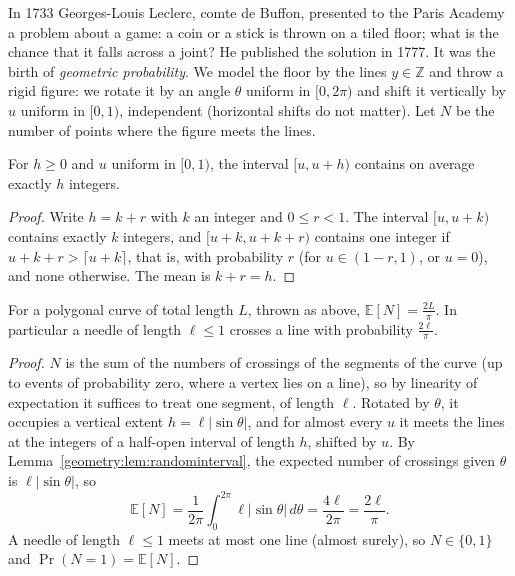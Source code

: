 In 1733 Georges-Louis Leclerc, comte de Buffon, presented to the Paris Academy a problem about a game: a coin or a stick is thrown on a tiled floor; what is the
chance that it falls across a joint? He published the solution in 1777. It was the birth of \emph{geometric probability}. We model the floor by the lines
$y\in\mathbb Z$ and throw a rigid figure: we rotate it by an angle $\theta$ uniform in $[0,2\pi)$ and shift it vertically by $u$ uniform in $[0,1)$, independent
(horizontal shifts do not matter). Let $N$ be the number of points where the figure meets the lines.

\begin{lemma}\label{geometry:lem:randominterval}
For $h\ge0$ and $u$ uniform in $[0,1)$, the interval $[u,u+h)$ contains on average exactly $h$ integers.
\end{lemma}

\begin{proof}
Write $h=k+r$ with $k$ an integer and $0\le r<1$. The interval $[u,u+k)$ contains exactly $k$ integers, and $[u+k,u+k+r)$ contains one integer if
$u+k+r>\lceil u+k\rceil$, that is, with probability $r$ (for $u\in(1-r,1)$, or $u=0$), and none otherwise. The mean is $k+r=h$.
\end{proof}

\begin{theorem}\label{geometry:thm:buffon}
For a polygonal curve of total length $L$, thrown as above, $\mathbb E[N]=\frac{2L}\pi$. In particular a needle of length $\ell\le1$ crosses a line with
probability $\frac{2\ell}\pi$.
\end{theorem}

\begin{proof}
$N$ is the sum of the numbers of crossings of the segments of the curve (up to events of probability zero, where a vertex lies on a line), so by
linearity of expectation it suffices to treat one segment, of length $\ell$. Rotated by $\theta$, it occupies a vertical extent $h=\ell|\sin\theta|$, and for
almost every $u$ it meets the lines at the integers of a half-open interval of length $h$, shifted by $u$. By Lemma~\ref{geometry:lem:randominterval}, the expected
number of crossings given $\theta$ is $\ell|\sin\theta|$, so
\[
\mathbb E[N]=\frac1{2\pi}\int_0^{2\pi}\ell|\sin\theta|\,d\theta=\frac{4\ell}{2\pi}=\frac{2\ell}\pi.
\]
A needle of length $\ell\le1$ meets at most one line (almost surely), so $N\in\{0,1\}$ and $\Pr(N=1)=\mathbb E[N]$.
\end{proof}

